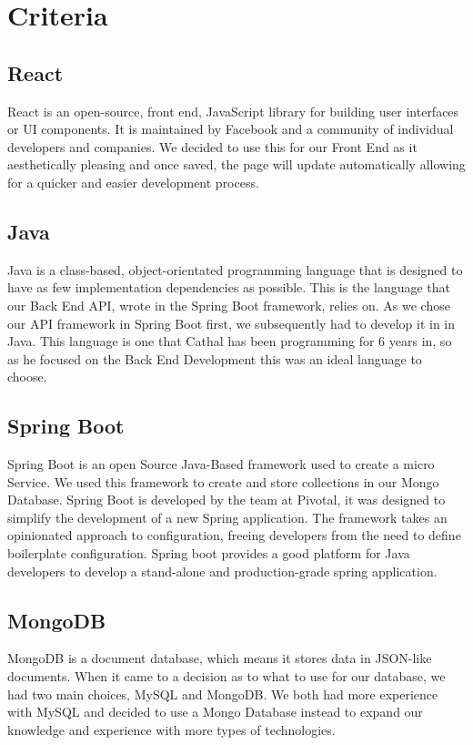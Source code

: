 \section{Criteria}
\subsection{React}
React is an open-source, front end, JavaScript library for building user interfaces or UI components. It is maintained by Facebook and a community of individual developers and companies. We decided to use this for our Front End as it aesthetically pleasing and once saved, the page will update automatically allowing for a quicker and easier development process.

\subsection{Java}
Java is a class-based, object-orientated programming language that is designed to have as few implementation dependencies as possible. This is the language that our Back End API, wrote in the Spring Boot framework, relies on. As we chose our API framework in Spring Boot first, we subsequently had to develop it in in Java. This language is one that Cathal has been programming for 6 years in, so as he focused on the Back End Development this was an ideal language to choose.

\subsection{Spring Boot}
Spring Boot is an open Source Java-Based framework used to create a micro Service. We used this framework to create and store collections in our Mongo Database. Spring Boot is developed by the team at Pivotal, it was designed to simplify the development of a new Spring application. The framework takes an opinionated approach to configuration, freeing developers from the need to define boilerplate configuration. Spring boot provides a good platform for Java developers to develop a stand-alone and production-grade spring application.

\subsection{MongoDB}
MongoDB is a document database, which means it stores data in JSON-like documents. When it came to a decision as to what to use for our database, we had two main choices, MySQL and MongoDB. We both had more experience with MySQL and decided to use a Mongo Database instead to expand our knowledge and experience with more types of technologies.

